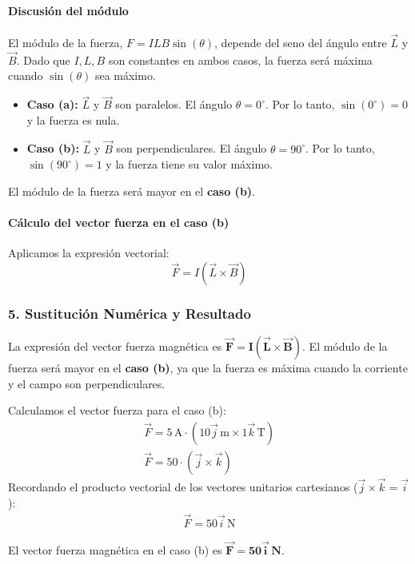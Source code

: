 \paragraph*{Discusión del módulo}
El módulo de la fuerza, $F = I L B \sin(\theta)$, depende del seno del ángulo entre $\vec{L}$ y $\vec{B}$. Dado que $I, L, B$ son constantes en ambos casos, la fuerza será máxima cuando $\sin(\theta)$ sea máximo.
\begin{itemize}
    \item \textbf{Caso (a):} $\vec{L}$ y $\vec{B}$ son paralelos. El ángulo $\theta = 0^\circ$. Por lo tanto, $\sin(0^\circ)=0$ y la fuerza es nula.
    \item \textbf{Caso (b):} $\vec{L}$ y $\vec{B}$ son perpendiculares. El ángulo $\theta = 90^\circ$. Por lo tanto, $\sin(90^\circ)=1$ y la fuerza tiene su valor máximo.
\end{itemize}
El módulo de la fuerza será mayor en el \textbf{caso (b)}.

\paragraph*{Cálculo del vector fuerza en el caso (b)}
Aplicamos la expresión vectorial:
$$\vec{F} = I(\vec{L} \times \vec{B})$$

\subsubsection*{5. Sustitución Numérica y Resultado}
\begin{cajaresultado}
La expresión del vector fuerza magnética es $\boldsymbol{\vec{F} = I(\vec{L} \times \vec{B})}$. El módulo de la fuerza será mayor en el \textbf{caso (b)}, ya que la fuerza es máxima cuando la corriente y el campo son perpendiculares.
\end{cajaresultado}

Calculamos el vector fuerza para el caso (b):
\begin{gather}
    \vec{F} = 5\,\text{A} \cdot (10\vec{j}\,\text{m} \times 1\vec{k}\,\text{T}) \\
    \vec{F} = 50 \cdot (\vec{j} \times \vec{k})
\end{gather}
Recordando el producto vectorial de los vectores unitarios cartesianos ($\vec{j} \times \vec{k} = \vec{i}$):
\begin{gather}
    \vec{F} = 50\vec{i}\,\text{N}
\end{gather}
\begin{cajaresultado}
El vector fuerza magnética en el caso (b) es $\boldsymbol{\vec{F} = 50\vec{i}\,\textbf{N}}$.
\end{cajaresultado}


